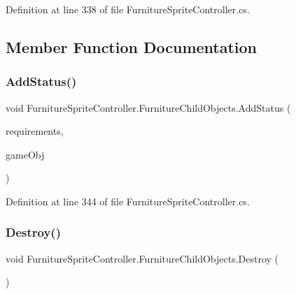 Definition at line 338 of file Furniture\+Sprite\+Controller.\+cs.



\subsection{Member Function Documentation}
\mbox{\label{class_furniture_sprite_controller_1_1_furniture_child_objects_aa0690cd9e06e27f998daae2ab034f6b4}} 
\subsubsection{\texorpdfstring{Add\+Status()}{AddStatus()}}
{\footnotesize\ttfamily void Furniture\+Sprite\+Controller.\+Furniture\+Child\+Objects.\+Add\+Status (\begin{DoxyParamCaption}\item[{\hyperlink{class_project_porcupine_1_1_buildable_1_1_components_1_1_buildable_component_a331a0d67512b8b402c04c8cf31c0ca8a}{Buildable\+Component.\+Requirements}}]{requirements,  }\item[{Game\+Object}]{game\+Obj }\end{DoxyParamCaption})}



Definition at line 344 of file Furniture\+Sprite\+Controller.\+cs.

\mbox{\label{class_furniture_sprite_controller_1_1_furniture_child_objects_a5e536900a345afc49db683a0f87bbc0b}} 
\subsubsection{\texorpdfstring{Destroy()}{Destroy()}}
{\footnotesize\ttfamily void Furniture\+Sprite\+Controller.\+Furniture\+Child\+Objects.\+Destroy (\begin{DoxyParamCaption}{ }\end{DoxyParamCaption})}



